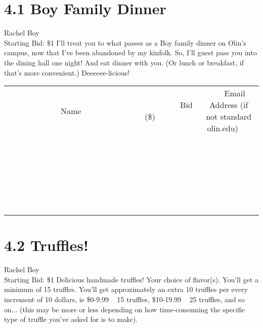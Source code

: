 \documentclass[11pt]{article}
\begin{document}
\section*{4.1 Boy Family Dinner}
Rachel Boy
\\
Starting Bid: \$1
\newline
I'll treat you to what passes as a Boy family dinner on Olin's campus, now that I've been abandoned by my kinfolk.  So, I'll guest pass you into the dining hall one night!  And eat dinner with you. (Or lunch or breakfast, if that's more convenient.)  Deeeeee-licious!
\\[6ex]
\begin{tabular}{c c c}
~~~~~~~~~~~~~Name~~~~~~~~~~~~~ & ~~~~~~~~~Bid (\$)~~~~~~~~~  & ~~~Email Address (if not standard olin.edu)~~~\\
 & & \\
\hline
 & & \\
\hline
 & & \\
\hline
 & & \\
\hline
 & & \\
\hline
 & & \\
\hline
 & & \\
\hline
 & & \\
\hline
 & & \\
\hline
 & & \\
\hline
 & & \\
\hline
 & & \\
\hline
 & & \\
\hline
 & & \\
\hline
 & & \\
\hline
 & & \\
\hline
 & & \\
\hline
 & & \\
\hline
 & & \\
\hline
 & & \\
\hline
 & & \\
\hline
 & & \\
\hline
 & & \\
\hline
 & & \\
\hline
 & & \\
\hline
 & & \\
\hline
\end{tabular}
\newpage
\section*{4.2 Truffles!}
Rachel Boy
\\
Starting Bid: \$1
\newline
Delicious handmade truffles! Your choice of flavor(s). You'll get a minimum of 15 truffles. You'll get approximately an extra 10 truffles per every increment of 10 dollars, ie \$0-9.99 ~ 15 truffles, \$10-19.99 ~ 25 truffles, and so on... (this may be more or less depending on how time-consuming the specific type of truffle you've asked for is to make). 
\end{document}

